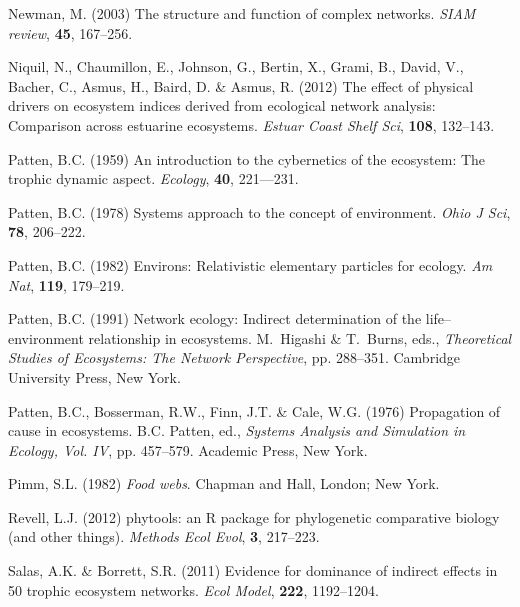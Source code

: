 \documentclass[11pt]{article}
\begin{document}
\begin{thebibliography}{79}
Newman, M. (2003) The structure and function of complex networks.
\newblock \emph{SIAM review}, \textbf{45}, 167--256.

Niquil, N., Chaumillon, E., Johnson, G., Bertin, X., Grami, B., David, V.,
  Bacher, C., Asmus, H., Baird, D. \& Asmus, R. (2012) The effect of physical
  drivers on ecosystem indices derived from ecological network analysis:
  Comparison across estuarine ecosystems.
\newblock \emph{Estuar Coast Shelf Sci}, \textbf{108}, 132--143.

Patten, B.C. (1959) An introduction to the cybernetics of the ecosystem: The
  trophic dynamic aspect.
\newblock \emph{Ecology}, \textbf{40}, 221---231.

Patten, B.C. (1978) Systems approach to the concept of environment.
\newblock \emph{Ohio J Sci}, \textbf{78}, 206--222.

Patten, B.C. (1982) Environs: Relativistic elementary particles for ecology.
\newblock \emph{Am Nat}, \textbf{119}, 179--219.

Patten, B.C. (1991) Network ecology: Indirect determination of the
  life--environment relationship in ecosystems.
\newblock M.~Higashi \& T.~Burns, eds., \emph{Theoretical Studies of
  Ecosystems: The Network Perspective}, pp. 288--351. Cambridge University
  Press, New York.

Patten, B.C., Bosserman, R.W., Finn, J.T. \& Cale, W.G. (1976) Propagation of
  cause in ecosystems.
\newblock B.C. Patten, ed., \emph{Systems Analysis and Simulation in Ecology,
  Vol. IV}, pp. 457--579. Academic Press, New York.

Pimm, S.L. (1982) \emph{Food webs}.
\newblock Chapman and Hall, London; New York.

Revell, L.J. (2012) phytools: an {R} package for phylogenetic comparative
  biology (and other things).
\newblock \emph{Methods Ecol Evol}, \textbf{3}, 217--223.

Salas, A.K. \& Borrett, S.R. (2011) Evidence for dominance of indirect effects
  in 50 trophic ecosystem networks.
\newblock \emph{Ecol Model}, \textbf{222}, 1192--1204.


\end{thebibliography}
\end{document}
